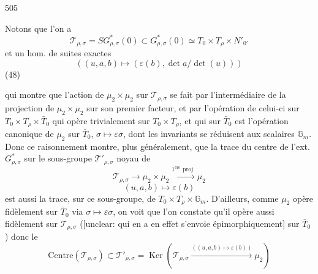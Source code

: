 \begin{enumerate}
\newpage



\newpage


505

Notons que l'on a
$$ \mathcal{T}_{\rho,\sigma} = S G_{\rho,\sigma}^*(0) \subset G_{\rho,\sigma}^*(0) \simeq T_0 \times T_\rho \times N'_{0'} $$
et un hom. de suites exactes
$$ ((u,a,b) \mapsto (\varepsilon(b), \det\underline{a}/\det(\underline{u}))) $$
(48)

qui montre que l'action de $\mu_2 \times \mu_2$ sur $\mathcal{T}_{\rho,\sigma}$ se fait par l'intermédiaire de la projection de $\mu_2 \times \mu_2$ sur son premier facteur, et par l'opération de celui-ci sur $T_0 \times T_\rho \times \bar{T}_0$ qui opère trivialement sur $T_0 \times T_\rho$, et qui sur $\bar{T}_0$ est l'opération canonique de $\mu_2$ sur $\bar{T}_0$, $\sigma \mapsto \varepsilon \sigma$, dont les invariants se réduisent aux scalaires $\mathbb{G}_m$. Donc ce raisonnement montre, plus généralement, que la trace du centre de l'ext. $G^*_{\rho,\sigma}$ sur le sous-groupe $\mathcal{T}'_{\rho,\sigma}$ noyau de 
$$ \mathcal{T}_{\rho,\sigma} \rightarrow \mu_2 \times \mu_2 \xrightarrow{1^{\text{ère}} \text{ proj.}} \mu_2 $$
$$ (u,a,b) \mapsto \varepsilon(b) $$
est aussi la trace, sur ce sous-groupe, de $T_0 \times T_\rho \times \mathbb{G}_m$. D'ailleurs, comme $\mu_2$ opère fidèlement sur $\bar{T}_0$ via $\sigma \mapsto \varepsilon \sigma$, on voit que l'on constate qu'il opère aussi fidèlement sur $\mathcal{T}_{\rho,\sigma}$ ([unclear: qui en a en effet s'envoie épimorphiquement] sur $\bar{T}_0$) donc le
$$ \text{Centre}(\mathcal{T}_{\rho,\sigma}) \subset \mathcal{T}'_{\rho,\sigma} = \operatorname{Ker}(\mathcal{T}_{\rho,\sigma} \xrightarrow{((u,a,b) \mapsto \varepsilon(b))} \mu_2) $$

\newpage



\end{enumerate}

